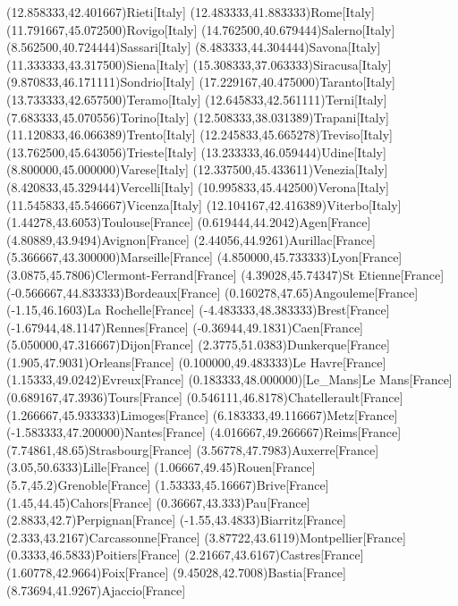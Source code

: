\mapput[90](12.858333,42.401667){Rieti}[Italy]
\mapput[90](12.483333,41.883333){Rome}[Italy]
\mapput[90](11.791667,45.072500){Rovigo}[Italy]
\mapput[90](14.762500,40.679444){Salerno}[Italy]
\mapput[90](8.562500,40.724444){Sassari}[Italy]
\mapput[90](8.483333,44.304444){Savona}[Italy]
\mapput[90](11.333333,43.317500){Siena}[Italy]
\mapput[0](15.308333,37.063333){Siracusa}[Italy]
\mapput[90](9.870833,46.171111){Sondrio}[Italy]
\mapput[90](17.229167,40.475000){Taranto}[Italy]
\mapput[90](13.733333,42.657500){Teramo}[Italy]
\mapput[90](12.645833,42.561111){Terni}[Italy]
\mapput[90](7.683333,45.070556){Torino}[Italy]
\mapput[90](12.508333,38.031389){Trapani}[Italy]
\mapput[90](11.120833,46.066389){Trento}[Italy]
\mapput[90](12.245833,45.665278){Treviso}[Italy]
\mapput[90](13.762500,45.643056){Trieste}[Italy]
\mapput[90](13.233333,46.059444){Udine}[Italy]
\mapput[90](8.800000,45.000000){Varese}[Italy]
\mapput[0](12.337500,45.433611){Venezia}[Italy]
\mapput[90](8.420833,45.329444){Vercelli}[Italy]
\mapput[90](10.995833,45.442500){Verona}[Italy]
\mapput[90](11.545833,45.546667){Vicenza}[Italy]
\mapput[90](12.104167,42.416389){Viterbo}[Italy]
\mapput[90](1.44278,43.6053){Toulouse}[France]
\mapput[90](0.619444,44.2042){Agen}[France]
\mapput[90](4.80889,43.9494){Avignon}[France]
\mapput[90](2.44056,44.9261){Aurillac}[France]
\mapput[90](5.366667,43.300000){Marseille}[France]
\mapput[0](4.850000,45.733333){Lyon}[France]
\mapput[-90](3.0875,45.7806){Clermont-Ferrand}[France]
\mapput[90](4.39028,45.74347){St Etienne}[France]
\mapput[90](-0.566667,44.833333){Bordeaux}[France]
\mapput[90](0.160278,47.65){Angouleme}[France]
\mapput[90](-1.15,46.1603){La Rochelle}[France]
\mapput[90](-4.483333,48.383333){Brest}[France]
\mapput[90](-1.67944,48.1147){Rennes}[France]
\mapput[-90](-0.36944,49.1831){Caen}[France]
\mapput[90](5.050000,47.316667){Dijon}[France]
\mapput[30](2.3775,51.0383){Dunkerque}[France]
\mapput[90](1.905,47.9031){Orleans}[France]
\mapput[180](0.100000,49.483333){Le Havre}[France]
\mapput[90](1.15333,49.0242){Evreux}[France]
\mapput[90](0.183333,48.000000)[Le_Mans]{Le Mans}[France]
\mapput[90](0.689167,47.3936){Tours}[France]
\mapput[90](0.546111,46.8178){Chatellerault}[France]
\mapput[90](1.266667,45.933333){Limoges}[France]
\mapput[90](6.183333,49.116667){Metz}[France]
\mapput[90](-1.583333,47.200000){Nantes}[France]
\mapput[90](4.016667,49.266667){Reims}[France]
\mapput[30](7.74861,48.65){Strasbourg}[France]
\mapput[30](3.56778,47.7983){Auxerre}[France]
\mapput[90](3.05,50.6333){Lille}[France]
\mapput[90](1.06667,49.45){Rouen}[France]
\mapput[90](5.7,45.2){Grenoble}[France]
\mapput[90](1.53333,45.16667){Brive}[France]
\mapput[90](1.45,44.45){Cahors}[France]
\mapput[90](0.36667,43.333){Pau}[France]
\mapput[90](2.8833,42.7){Perpignan}[France]
\mapput[90](-1.55,43.4833){Biarritz}[France]
\mapput[90](2.333,43.2167){Carcassonne}[France]
\mapput[90](3.87722,43.6119){Montpellier}[France]
\mapput[90](0.3333,46.5833){Poitiers}[France]
\mapput[0](2.21667,43.6167){Castres}[France]
\mapput[90](1.60778,42.9664){Foix}[France]
\mapput[90](9.45028,42.7008){Bastia}[France]
\mapput[90](8.73694,41.9267){Ajaccio}[France]
